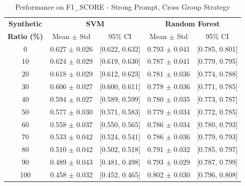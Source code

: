 \begin{table}[h]
\centering
\caption{Performance on F1_SCORE - Strong Prompt, Cross Group Strategy}
\label{tab:strong_cross_group_f1_score}
\begin{tabular}{c|cc|cc}
\hline
\textbf{Synthetic} & \multicolumn{2}{c|}{\textbf{SVM}} & \multicolumn{2}{c}{\textbf{Random Forest}} \\
\textbf{Ratio (\%)} & Mean $\pm$ Std & 95\% CI & Mean $\pm$ Std & 95\% CI \\
\hline
0 & 0.627 $\pm$ 0.026 & [0.622, 0.632] & 0.793 $\pm$ 0.041 & [0.785, 0.801] \\
10 & 0.624 $\pm$ 0.029 & [0.619, 0.630] & 0.787 $\pm$ 0.041 & [0.779, 0.795] \\
20 & 0.618 $\pm$ 0.029 & [0.612, 0.623] & 0.781 $\pm$ 0.036 & [0.774, 0.788] \\
30 & 0.606 $\pm$ 0.027 & [0.600, 0.611] & 0.778 $\pm$ 0.036 & [0.771, 0.785] \\
40 & 0.594 $\pm$ 0.027 & [0.589, 0.599] & 0.780 $\pm$ 0.035 & [0.773, 0.787] \\
50 & 0.577 $\pm$ 0.030 & [0.571, 0.583] & 0.779 $\pm$ 0.034 & [0.772, 0.785] \\
60 & 0.558 $\pm$ 0.037 & [0.550, 0.565] & 0.786 $\pm$ 0.034 & [0.780, 0.793] \\
70 & 0.533 $\pm$ 0.042 & [0.524, 0.541] & 0.786 $\pm$ 0.036 & [0.779, 0.793] \\
80 & 0.510 $\pm$ 0.042 & [0.502, 0.518] & 0.791 $\pm$ 0.032 & [0.785, 0.797] \\
90 & 0.489 $\pm$ 0.043 & [0.481, 0.498] & 0.793 $\pm$ 0.029 & [0.787, 0.799] \\
100 & 0.458 $\pm$ 0.032 & [0.452, 0.465] & 0.802 $\pm$ 0.030 & [0.796, 0.808] \\
\hline
\end{tabular}
\end{table}
